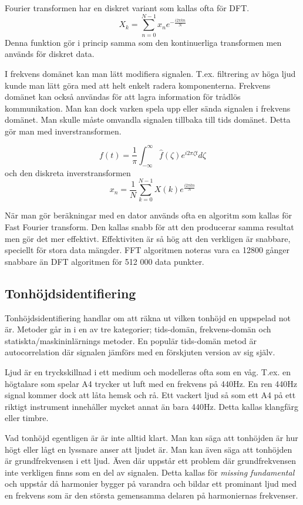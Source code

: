 Fourier transformen har en diskret variant som kallas ofta för DFT. 
$$X_k = \sum_{n=0}^{N-1} x_ne^{-\frac{i2\pi kn}{N}}$$
Denna funktion gör i princip samma som den kontinuerliga transformen men används för diskret data.

I frekvens domänet kan man lätt modifiera signalen. T.ex. filtrering av höga ljud kunde man lätt göra med att helt enkelt radera komponenterna. Frekvens domänet kan också användas för att lagra information för trådlös kommunikation. Man kan dock varken spela upp eller sända signalen i frekvens domänet. Man skulle måste omvandla signalen tillbaka till tids domänet. Detta gör man med inverstransformen. 

$$ f(t) = \frac{1}{\pi}\int_{-\infty}^{\infty} \hat{f}(\zeta)e^{i2\pi\zeta t} d\zeta$$
och den diskreta inverstransformen
$$ x_n = \frac{1}{N}\sum_{k=0}^{N-1} X(k)e^{\frac{i2\pi kn}{N}}$$

När man gör beräkningar med en dator används ofta en algoritm som kallas för Fast Fourier transform. Den kallas snabb för att den producerar samma resultat men  gör det mer effektivt. Effektiviten är så hög att den verkligen är snabbare, speciellt för stora data mängder. FFT algoritmen noteras vara ca 12800 gånger snabbare än DFT algoritmen för 512 000 data punkter.  
\subsection*{Tonhöjdsidentifiering}
Tonhöjdsidentifiering handlar om att räkna ut vilken tonhöjd en uppspelad not är. Metoder går in i en av tre kategorier; tids-domän, frekvens-domän och statiskta/maskininlärnings metoder. En populär tids-domän metod är autocorrelation där signalen jämförs med en förskjuten version av sig själv. 

Ljud är en tryckskillnad i ett medium och modelleras ofta som en våg. T.ex. en högtalare som spelar A4 trycker ut luft med en frekvens på 440Hz. En ren 440Hz signal kommer dock att låta hemsk och rå. Ett vackert ljud så som ett A4 på ett riktigt instrument innehåller mycket annat än bara 440Hz. Detta kallas klangfärg eller timbre.

Vad tonhöjd egentligen är är inte alltid klart. Man kan säga att tonhöjden är hur högt eller lågt en lyssnare anser att ljudet är. Man kan även säga att tonhöjden är grundfrekvensen i ett ljud. Även där uppstår ett problem där grundfrekvensen inte verkligen finns som en del av signalen. Detta kallas för \textit{missing fundamental} och uppstår då harmonier bygger på varandra och bildar ett prominant ljud med en frekvens som är den största gemensamma delaren på harmoniernas frekvenser.

